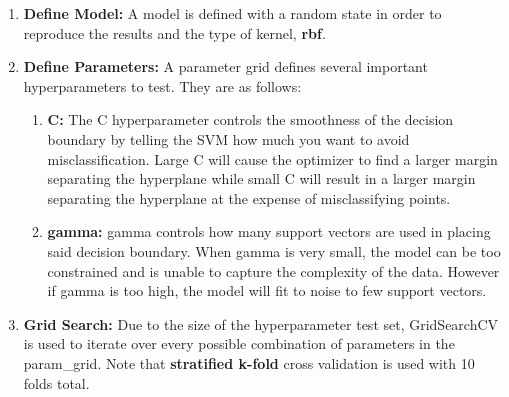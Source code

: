 \documentclass[11pt]{article}
\begin{document}
	\begin{enumerate}
		\item \textbf{Define Model:} A model is defined with a random state in order to reproduce the results and the type of kernel, \textbf{rbf}.
		\item \textbf{Define Parameters:} A parameter grid defines several important hyperparameters to test. They are as follows:
		\begin{enumerate}
			\item \textbf{C:} The C hyperparameter controls the smoothness of the decision boundary by telling the SVM  how much you want to avoid misclassification. Large C will cause the optimizer to find a larger margin separating the hyperplane while small C will result in a larger margin separating the hyperplane at the expense of misclassifying points.
			\item \textbf{gamma:} gamma controls how many support vectors are used in placing said decision boundary. When gamma is very small, the model can be too constrained and is unable to capture the complexity of the data. However if gamma is too high, the model will fit to noise to few support vectors.
		\end{enumerate}
		\item \textbf{Grid Search:} Due to the size of the hyperparameter test set, GridSearchCV is used to iterate over every possible combination of parameters in the param\_grid. Note that \textbf{stratified k-fold} cross validation is used with 10 folds total. 
	\end{enumerate}	
\end{document}
